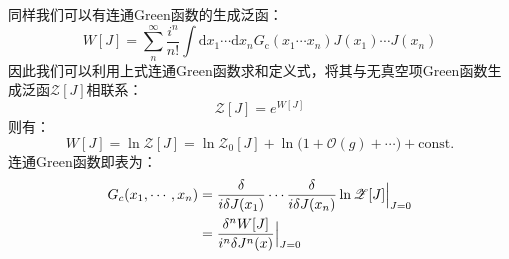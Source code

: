 同样我们可以有连通Green函数的生成泛函：
\begin{equation}
{W}[J]=\sum_{n}^{\infty}\frac{i^n}{n!}\int\mathrm{d}x_1\cdots\mathrm{d}x_n G_{\text{c}}(x_1\cdots x_n)J(x_1)\cdots J(x_n)
\end{equation}
因此我们可以利用上式连通Green函数求和定义式，将其与无真空项Green函数生成泛函$\mathscr{Z}[J]$相联系：
\begin{equation}
\mathscr{Z}[J]=e^{{W}[J]}
\end{equation}
则有：
\begin{equation}
{W}[J]=\ln\mathscr{Z}[J]=\ln \mathcal{Z}_0[J]+\ln\Big(1+\mathcal{O}(g)+\cdots\Big)+\text{const.}
\end{equation}
连通Green函数即表为：
\begin{align}
G_c(x_1,\cdots,x_n)&=\frac{\delta}{i\delta J(x_1)}\cdots\frac{\delta}{i\delta J(x_n)}\ln\mathscr{Z}[J]\Big|_{J=0}\notag\\
&=\frac{\delta^n W[J]}{i^n\delta J^n(x)}\Big|_{J=0}
\end{align}


